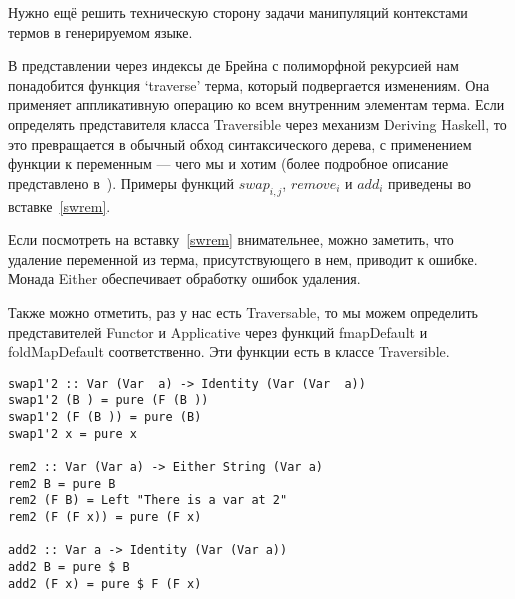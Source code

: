 Нужно ещё решить техническую сторону задачи манипуляций контекстами термов в генерируемом языке.

В представлении через индексы де Брейна с полиморфной рекурсией нам понадобится функция `traverse' терма, который подвергается изменениям. Она применяет аппликативную операцию ко всем внутренним элементам терма. Если определять представителя класса Traversible через механизм Deriving Haskell\cite{deriveFun}, то это превращается в обычный обход синтаксического дерева, с применением функции к переменным --- чего мы и хотим (более подробное описание представлено в~\cite{bound}). Примеры функций $swap_{i,j}$, $remove_i$ и $add_i$ приведены во вставке~\ref{swrem}.

Если посмотреть на вставку~\ref{swrem} внимательнее, можно заметить, что удаление переменной из терма, присутствующего в нем, приводит к ошибке. Монада Either обеспечивает обработку ошибок удаления.

Также можно отметить, раз у нас есть Traversable, то мы можем определить представителей Functor и Applicative через функций fmapDefault и foldMapDefault соответственно. Эти функции есть в классе Traversible.

\begin{lstlisting}[label={swrem}, caption={Примеры функций $swap_{i,j}$, $remove_i$ и $add_i$},captionpos=b, frame=single, float, floatplacement=H]
swap1'2 :: Var (Var  a) -> Identity (Var (Var  a))
swap1'2 (B ) = pure (F (B ))
swap1'2 (F (B )) = pure (B)
swap1'2 x = pure x

rem2 :: Var (Var a) -> Either String (Var a)
rem2 B = pure B
rem2 (F B) = Left "There is a var at 2"
rem2 (F (F x)) = pure (F x)

add2 :: Var a -> Identity (Var (Var a))
add2 B = pure $ B
add2 (F x) = pure $ F (F x)
\end{lstlisting}








